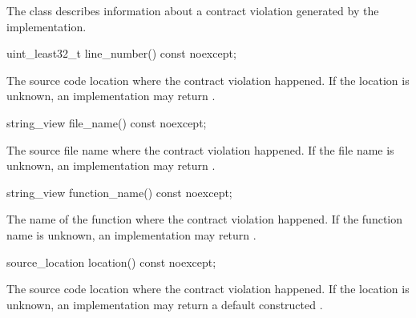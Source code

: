 \documentclass{wg21}
\begin{document}
\pnum
The class  describes information about
a contract violation generated by the implementation.

\begin{removedblock}
\begin{itemdecl}
	uint_least32_t line_number() const noexcept;
\end{itemdecl}

\begin{itemdescr}
	\pnum
	\returns The source code location
	where the contract violation happened.
	If the location is unknown, an implementation may return .
\end{itemdescr}

%
\begin{itemdecl}
	string_view file_name() const noexcept;
\end{itemdecl}

\begin{itemdescr}
	\pnum
	\returns The source file name
	where the contract violation happened.
	If the file name is unknown,
	an implementation may return .
\end{itemdescr}

%
\begin{itemdecl}
	string_view function_name() const noexcept;
\end{itemdecl}

\begin{itemdescr}
	\pnum
	\returns The name of the function
	where the contract violation happened.
	If the function name is unknown,
	an implementation may return .
\end{itemdescr}

\end{removedblock}

\begin{addedblock}
\begin{itemdecl}
	source_location location() const noexcept;
\end{itemdecl}

\begin{itemdescr}
	\pnum
	\returns The source code location
	where the contract violation happened.
	If the location is unknown, an implementation may return a default constructed .
\end{itemdescr}
\end{addedblock}
\end{document}
